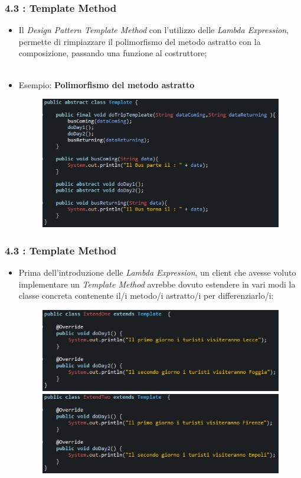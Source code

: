 \documentclass{beamer}
\begin{document}
\begin{frame}
	\frametitle{\textbf{4.3 : Template Method}}
	\begin{itemize}
		\item
			Il \textit{Design Pattern Template Method} con l'utilizzo delle \textit{Lambda Expression}, permette di rimpiazzare il polimorfismo del metodo astratto con la composizione, passando una funzione al costruttore;\\\
		\item
			Esempio: \textbf{Polimorfismo del metodo astratto}				
			\begin{figure}
				\centering
				\includegraphics[width=0.8\linewidth]{image/template.png}
				\label{fig:target}
			\end{figure}
	\end{itemize}
\end{frame}


\begin{frame}
	\frametitle{\textbf{4.3 : Template Method}}
	\begin{itemize}
		\item
			Prima dell'introduzione delle \textit{Lambda Expression}, un client che avesse voluto implementare un \textit{Template Method} avrebbe dovuto estendere in vari modi la classe concreta contenente il/i metodo/i astratto/i per differenziarlo/i:
			\begin{figure}
				\centering
				\includegraphics[width=0.7\linewidth]{image/extendOne.png}
				\label{fig:target}
				\centering
				\includegraphics[width=0.7\linewidth]{image/extendTwo.png}
				\label{fig:target}
			\end{figure}
	\end{itemize}
\end{frame}
\end{document}
